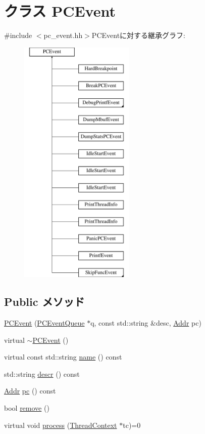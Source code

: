 \hypertarget{classPCEvent}{
\section{クラス PCEvent}
\label{classPCEvent}
}


{\ttfamily \#include $<$pc\_\-event.hh$>$}PCEventに対する継承グラフ:\begin{figure}[H]
\begin{center}
\leavevmode
\includegraphics[height=12cm]{classPCEvent}
\end{center}
\end{figure}
\subsection*{Public メソッド}
\begin{DoxyCompactItemize}
\item 
\hyperlink{classPCEvent_a1b5a319c031d0e7aa4be20426ff7894e}{PCEvent} (\hyperlink{classPCEventQueue}{PCEventQueue} $\ast$q, const std::string \&desc, \hyperlink{base_2types_8hh_af1bb03d6a4ee096394a6749f0a169232}{Addr} pc)
\item 
virtual \hyperlink{classPCEvent_a47c2884f3487f915465e6f5481118860}{$\sim$PCEvent} ()
\item 
virtual const std::string \hyperlink{classPCEvent_adbcff144e5e199d332a1352af1798148}{name} () const 
\item 
std::string \hyperlink{classPCEvent_af881f46ec963ab63a4eb03fa1f5ea728}{descr} () const 
\item 
\hyperlink{base_2types_8hh_af1bb03d6a4ee096394a6749f0a169232}{Addr} \hyperlink{classPCEvent_a4012b666ba851e747ea4229c7cf55c5b}{pc} () const 
\item 
bool \hyperlink{classPCEvent_a1f9c4a4bd47b7cd9beb431504c5ae46c}{remove} ()
\item 
virtual void \hyperlink{classPCEvent_af6ff225900b7b98c08880da7225b38f0}{process} (\hyperlink{classThreadContext}{ThreadContext} $\ast$tc)=0
\end{DoxyCompactItemize}
